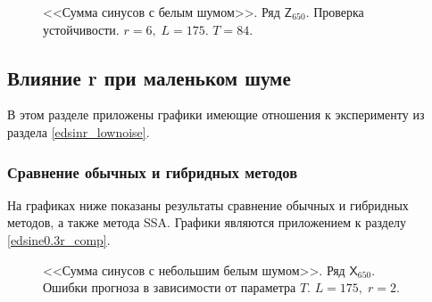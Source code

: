 \documentclass[specialist,
               substylefile = spbu.rtx,
               subf,href,colorlinks=true, 12p]{disser}
\begin{document}
\begin{figure}[h]
	\captionsetup{justification=centering}
	\caption{<<Сумма синусов с белым шумом>>. Ряд $\mathsf{Z}_{650}$. Проверка устойчивости. $r = 6, \; L = 175$. $T = 84$.}
	\label{edsiner6.84}
\end{figure}

\clearpage

\subsection{Влияние r при маленьком шуме}

В этом разделе приложены графики имеющие отношения к эксперименту из раздела \ref{edsinr_lownoise}.

\subsubsection{Сравнение обычных и гибридных методов}
\label{aedsine0.3r_comp}
На графиках ниже показаны результаты сравнение обычных и гибридных методов, а также метода SSA. Графики являются приложением к разделу \ref{edsine0.3r_comp}.

\begin{figure}[H]
	\captionsetup{justification=centering}
	\caption{<<Сумма синусов с небольшим белым шумом>>. Ряд $\mathsf{X}_{650}$. Ошибки прогноза в зависимости от параметра $T$. $L = 175, \; r = 2$.}
\end{figure}
\end{document}
